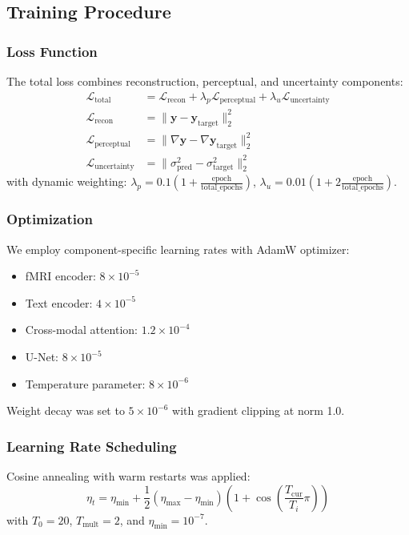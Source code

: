 \subsection{Training Procedure}

\subsubsection{Loss Function}
The total loss combines reconstruction, perceptual, and uncertainty components:
\begin{align}
\mathcal{L}_{\text{total}} &= \mathcal{L}_{\text{recon}} + \lambda_p \mathcal{L}_{\text{perceptual}} + \lambda_u \mathcal{L}_{\text{uncertainty}} \\
\mathcal{L}_{\text{recon}} &= \|\mathbf{y} - \mathbf{y}_{\text{target}}\|_2^2 \\
\mathcal{L}_{\text{perceptual}} &= \|\nabla \mathbf{y} - \nabla \mathbf{y}_{\text{target}}\|_2^2 \\
\mathcal{L}_{\text{uncertainty}} &= \|\sigma_{\text{pred}}^2 - \sigma_{\text{target}}^2\|_2^2
\end{align}
with dynamic weighting: $\lambda_p = 0.1(1 + \frac{\text{epoch}}{\text{total\_epochs}})$, $\lambda_u = 0.01(1 + 2\frac{\text{epoch}}{\text{total\_epochs}})$.

\subsubsection{Optimization}
We employ component-specific learning rates with AdamW optimizer:
\begin{itemize}
    \item fMRI encoder: $8 \times 10^{-5}$
    \item Text encoder: $4 \times 10^{-5}$
    \item Cross-modal attention: $1.2 \times 10^{-4}$
    \item U-Net: $8 \times 10^{-5}$
    \item Temperature parameter: $8 \times 10^{-6}$
\end{itemize}
Weight decay was set to $5 \times 10^{-6}$ with gradient clipping at norm 1.0.

\subsubsection{Learning Rate Scheduling}
Cosine annealing with warm restarts was applied:
\begin{equation}
\eta_t = \eta_{\min} + \frac{1}{2}(\eta_{\max} - \eta_{\min})(1 + \cos(\frac{T_{\text{cur}}}{T_i}\pi))
\end{equation}
with $T_0 = 20$, $T_{\text{mult}} = 2$, and $\eta_{\min} = 10^{-7}$.


